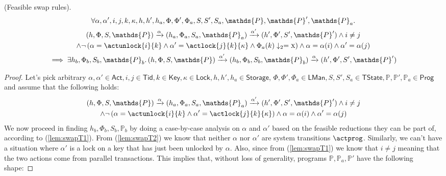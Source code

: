 \begin{lem}
	\label{lem:swapT}
	(Feasible swap rules).
	\begin{gather*}
		\forall
			\alpha, \alpha',
			i, j, k, \kappa,
			h, h', h_a,
			\Phi, \Phi', \Phi_a,
			S, S', S_a,
			\mathds{P}, \mathds{P}', \mathds{P}_a
		\ldotp \\
		(h, \Phi, S, \mathds{P})
			\xrightarrow{\alpha}
		(h_a, \Phi_a, S_a, \mathds{P}_a)
			\xrightarrow{\alpha'}
		(h', \Phi', S', \mathds{P}')
			\land
			i \neq j \\
			\land
		\lnot \left( \alpha = \actunlock{i}{k}
			\land
		\alpha' = \actlock{j}{k}{\kappa}
			\land
		\Phi_a(k) \downarrow_2 = \textsc{x} \right)
			\land
		\alpha = \alpha(i)
			\land
		\alpha' = \alpha(j) \\
			\implies
		\exists h_b, \Phi_b, S_b, \mathds{P}_b \ldotp
		(h, \Phi, S, \mathds{P})
			\xrightarrow{\alpha'}
		(h_b, \Phi_b, S_b, \mathds{P}_b)
			\xrightarrow{\alpha}
		(h', \Phi', S', \mathds{P}')
	\end{gather*}
	\begin{proof}
	Let's pick arbitrary $\alpha, \alpha' \in \mathsf{Act}, i, j \in \mathsf{Tid}, k \in \mathsf{Key}, \kappa \in \mathsf{Lock}, h, h', h_a \in \mathsf{Storage}$, $\Phi, \Phi', \Phi_a \in \mathsf{LMan}, S, S', S_a \in \mathsf{TState}, \mathds{P}, \mathds{P}', \mathds{P}_a \in \mathsf{Prog}$ and assume that the following holds:
	\begin{gather}
		\label{lem:swapT1}
		(h, \Phi, S, \mathds{P})
			\xrightarrow{\alpha}
		(h_a, \Phi_a, S_a, \mathds{P}_a)
			\xrightarrow{\alpha'}
		(h', \Phi', S', \mathds{P}')
			\land
			i \neq j \\
			\land
		\label{lem:swapT2}
		\lnot \left( \alpha = \actunlock{i}{k}
			\land
		\alpha' = \actlock{j}{k}{\kappa} \right)
			\land
		\alpha = \alpha(i)
			\land
		\alpha' = \alpha(j)
	\end{gather}
	We now proceed in finding $h_b, \Phi_b, S_b, \mathds{P}_b$ by doing a case-by-case analysis on $\alpha$ and $\alpha'$ based on the feasible reductions they can be part of, according to (\ref{lem:swapT1}). From (\ref{lem:swapT2}) we know that neither $\alpha$ nor $\alpha'$ are system transitions $\actprog$. Similarly, we can't have a situation where $\alpha'$ is a lock on a key that has just been unlocked by $\alpha$. Also, since from (\ref{lem:swapT1}) we know that $i \neq j$ meaning that the two actions come from parallel transactions. This implies that, without loss of generality, programs $\mathds{P}, \mathds{P}_a, \mathds{P}'$ have the following shape:

\end{proof}
\end{lem}
